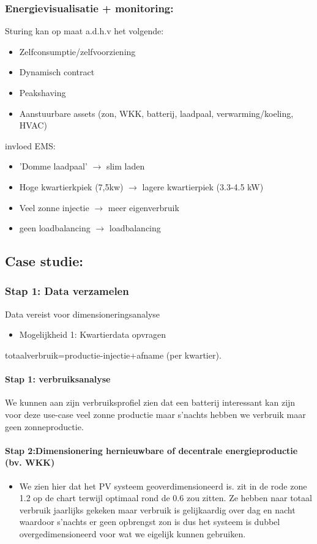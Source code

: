 \documentclass[12pt]{article}
\begin{document}
\subsubsection{Energievisualisatie + monitoring:}
Sturing kan op maat a.d.h.v het volgende:\begin{itemize}
    \item Zelfconsumptie/zelfvoorziening 
    \item Dynamisch contract 
    \item Peakshaving 
    \item Aanstuurbare assets (zon, WKK, batterij, laadpaal, verwarming/koeling, HVAC)
\end{itemize}
invloed EMS:\begin{itemize}
    \item 'Domme laadpaal' $\rightarrow$ slim laden  
    \item Hoge kwartierkpiek (7,5kw) $\rightarrow$ lagere kwartierpiek (3.3-4.5 kW)
    \item Veel zonne injectie $\rightarrow$ meer eigenverbruik
    \item geen loadbalancing $\rightarrow$ loadbalancing
\end{itemize}
\subsection{Case studie:}
\subsubsection{Stap 1: Data verzamelen}
Data vereist voor dimensioneringsanalyse\begin{itemize}
    \item Mogelijkheid 1: Kwartierdata opvragen
\end{itemize}
totaalverbruik=productie-injectie+afname (per kwartier).
\paragraph{Stap 1: verbruiksanalyse}
We kunnen aan zijn verbruiksprofiel zien dat een batterij interessant kan zijn voor deze use-case veel zonne productie maar s'nachts hebben we verbruik maar geen zonneproductie.
\paragraph{Stap 2:Dimensionering hernieuwbare of decentrale energieproductie (bv. WKK)}
\begin{itemize}
    \item [] We zien hier dat het PV systeem geoverdimensioneerd is. zit in de rode zone 1.2 op de chart terwijl optimaal rond de 0.6 zou zitten. Ze hebben naar totaal verbruik jaarlijks gekeken maar verbruik is gelijkaardig over dag en nacht waardoor s'nachts er geen opbrengst zon is dus het systeem is dubbel overgedimensioneerd voor wat we eigelijk kunnen gebruiken. 
\end{itemize}
\end{document}
